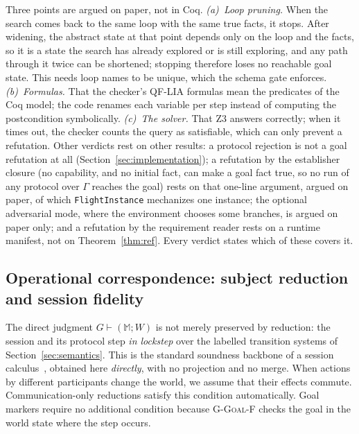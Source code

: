 \documentclass{article}
\theoremstyle{plain}
\theoremstyle{definition}
\newcommand{\id}[1]{\texttt{#1}}
\newcommand{\MM}{\mathbb{M}}
\def \bgc {}
\def \egc {}
\newcommand{\enew}{\endgroup}
\begin{document}
Three points are argued on paper, not in Coq. \emph{(a)~Loop pruning.} When
the search comes back to the same loop with the same true facts, it stops.
After widening, the abstract state at that point depends only on the loop and
the facts, so it is a state the search has already explored or is still
exploring, and any path through it twice can be shortened; stopping therefore
loses no reachable goal state. This needs loop names to be unique, which the
schema gate enforces. \emph{(b)~Formulas.} That the checker's QF-LIA formulas mean the
predicates of the Coq model; the code renames each variable per step instead of
computing the postcondition symbolically. \emph{(c)~The solver.} That Z3
answers correctly; when it times out, the checker counts the query as
satisfiable, which can only prevent a refutation. Other verdicts rest on other
results: a protocol rejection is not a goal refutation at all
(Section~\ref{sec:implementation}); a refutation by the establisher closure
(no capability, and no initial fact, can make a goal fact true, so no run of
any protocol over $\Gamma$ reaches the goal) rests on that one-line argument,
argued on paper, of which \id{FlightInstance} mechanizes one instance; the
optional adversarial mode, where the environment chooses some branches, is
argued on paper only;
and a refutation by the requirement reader rests on a runtime manifest, not on
Theorem~\ref{thm:ref}. Every verdict states which of these covers it.
\enew

\subsection{Operational correspondence: subject reduction and session fidelity}
\label{sec:safety-meta}
The direct judgment $G\vdash(\MM;W)$ is not merely preserved by reduction: the
session and its protocol step \emph{in lockstep} over the labelled transition
systems of Section~\ref{sec:semantics}. This is the standard soundness backbone
of a session
calculus~\cite{honda,scalasyoshida}, obtained here \emph{directly}, with no
projection and no merge. 
\bgc When actions by different participants change the world, we assume that
their effects commute. Communication-only reductions satisfy this condition
automatically. Goal markers require no additional condition because
\textsc{G-Goal-F} checks the goal in the world state where the step occurs.\egc
\end{document}

